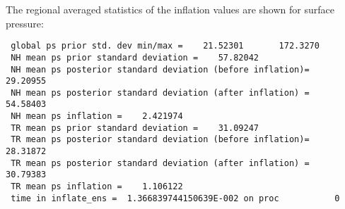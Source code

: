 The regional averaged statistics of the inflation values are shown for surface pressure:
\begin{scriptsize}
\begin{verbatim}
 global ps prior std. dev min/max =    21.52301       172.3270
 NH mean ps prior standard deviation =    57.82042
 NH mean ps posterior standard deviation (before inflation)=    29.20955
 NH mean ps posterior standard deviation (after inflation) =    54.58403
 NH mean ps inflation =    2.421974
 TR mean ps prior standard deviation =    31.09247
 TR mean ps posterior standard deviation (before inflation)=    28.31872
 TR mean ps posterior standard deviation (after inflation) =    30.79383
 TR mean ps inflation =    1.106122
 time in inflate_ens =  1.366839744150639E-002 on proc           0
\end{verbatim}
\end{scriptsize}

